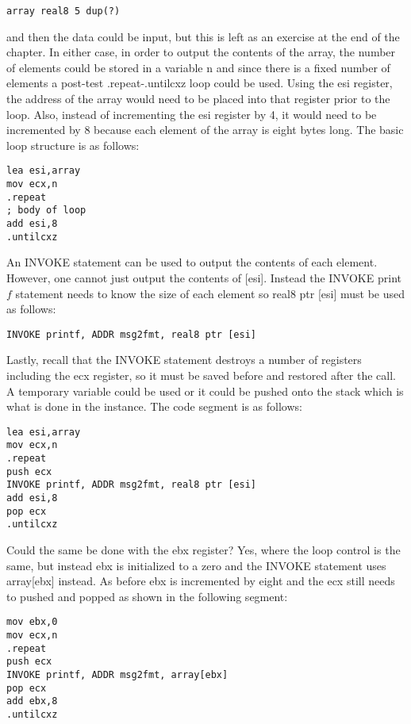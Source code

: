 \documentclass[10pt]{article}
\begin{document}
\begin{verbatim}
array real8 5 dup(?)
\end{verbatim}

and then the data could be input, but this is left as an exercise at the end of the chapter. In either case, in order to output the contents of the array, the number of elements could be stored in a variable n and since there is a fixed number of elements a post-test .repeat-.untilcxz loop could be used. Using the esi register, the address of the array would need to be placed into that register prior to the loop. Also, instead of incrementing the esi register by 4, it would need to be incremented by 8 because each element of the array is eight bytes long. The basic loop structure is as follows:

\begin{verbatim}
lea esi,array
mov ecx,n
.repeat
; body of loop
add esi,8
.untilcxz
\end{verbatim}

An INVOKE statement can be used to output the contents of each element. However, one cannot just output the contents of [esi]. Instead the INVOKE print $f$ statement needs to know the size of each element so real8 ptr [esi] must be used as follows:

\begin{verbatim}
INVOKE printf, ADDR msg2fmt, real8 ptr [esi]
\end{verbatim}

Lastly, recall that the INVOKE statement destroys a number of registers including the ecx register, so it must be saved before and restored after the call. A temporary variable could be used or it could be pushed onto the stack which is what is done in the instance. The code segment is as follows:

\begin{verbatim}
lea esi,array
mov ecx,n
.repeat
push ecx
INVOKE printf, ADDR msg2fmt, real8 ptr [esi]
add esi,8
pop ecx
.untilcxz
\end{verbatim}

Could the same be done with the ebx register? Yes, where the loop control is the same, but instead ebx is initialized to a zero and the INVOKE statement uses array[ebx] instead. As before ebx is incremented by eight and the ecx still needs to pushed and popped as shown in the following segment:

\begin{verbatim}
mov ebx,0
mov ecx,n
.repeat
push ecx
INVOKE printf, ADDR msg2fmt, array[ebx]
pop ecx
add ebx,8
.untilcxz
\end{verbatim}
\end{document}
